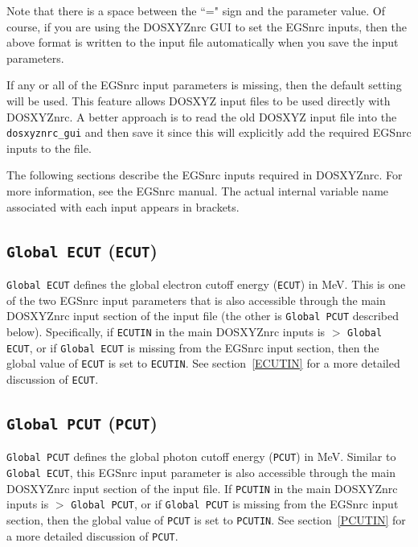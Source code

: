 \documentclass[12pt,twoside]{article}      %
\begin{document}
Note that there is a space between the ``=" sign and the parameter value.
Of course, if you are using the DOSXYZnrc GUI to set the EGSnrc inputs, then
the above format is written to the input file automatically when you save
the input parameters.

If any or all of the EGSnrc input parameters is missing, then the default
setting will be used. This feature allows DOSXYZ input files to be used
directly with DOSXYZnrc. A better approach is to read the old DOSXYZ input
file into the {\tt dosxyznrc\_gui} and then save it since this will explicitly
add the required EGSnrc inputs to the file.

The following sections describe the EGSnrc inputs required in
DOSXYZnrc.  For more information, see the EGSnrc manual\cite{KR00}. The
actual internal variable name associated with each input appears in brackets.

\subsection{ {\tt Global ECUT} ({\tt ECUT})}

{\tt Global ECUT} defines the global electron cutoff energy ({\tt ECUT})
in MeV.
This is one of the two EGSnrc input parameters that is also accessible
through the main DOSXYZnrc input section of the input file (the other
is {\tt Global PCUT} described below).  Specifically, if {\tt ECUTIN}
in the main
DOSXYZnrc inputs is $>$ {\tt Global ECUT}, or if {\tt Global ECUT} is
missing from the EGSnrc input section, then the global value of
{\tt ECUT} is set to {\tt ECUTIN}.  See section~\ref{ECUTIN} for a more
detailed discussion of {\tt ECUT}.

\subsection{ {\tt Global PCUT} ({\tt PCUT})}

{\tt Global PCUT} defines the global photon cutoff energy ({\tt PCUT})
in MeV.
Similar to {\tt Global ECUT}, this EGSnrc input parameter is also accessible
through the main DOSXYZnrc input section of the input file.
If {\tt PCUTIN} in the main
DOSXYZnrc inputs is $>$ {\tt Global PCUT}, or if {\tt Global PCUT} is
missing from the EGSnrc input section, then the global value of
{\tt PCUT} is set to {\tt PCUTIN}.  See section~\ref{PCUTIN} for a more
detailed discussion of {\tt PCUT}.
\end{document}
